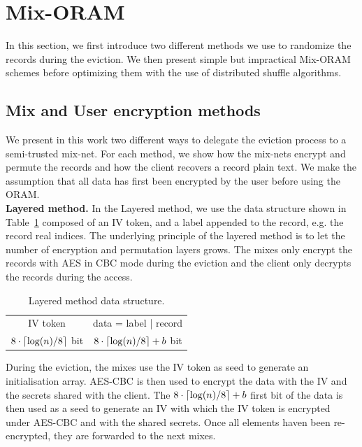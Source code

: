 \documentclass[USenglish,oneside,twocolumn]{article}
\DeclarePairedDelimiter{\ceil}{\lceil}{\rceil}
\begin{document}
\section{Mix-ORAM}\label{Mix-ORAM}
In this section, we first introduce two different methods we use to randomize the records during the eviction. We then present simple but impractical Mix-ORAM schemes before optimizing them with the use of distributed shuffle algorithms. 
%
\subsection{Mix and User encryption methods}\label{Enc}
We present in this work two different ways to delegate the eviction process to a semi-trusted mix-net. For each method, we show how the mix-nets encrypt and permute the records and how the client recovers a record plain text.
We make the assumption that all data has first been encrypted by the user before using the ORAM. \\

\textbf{Layered method.} In the Layered method, we use the data structure shown in Table~\ref{ldata} composed of an IV token, and a label appended to the record, e.g. the record real indices. The underlying principle of the layered method is to let the number of encryption and permutation layers grows. The mixes only encrypt the records with AES in CBC mode during the eviction and the client only decrypts the records during the access. 

\begin{table}[H]
\begin{minipage}[t][][b]{.475\textwidth}
\vspace{0pt}
\centering
\begin{tabular}{|c|c|}
IV token  &  data = label | record  \\
$8\cdot\ceil{\log(n)/8}$ bit  &  $8\cdot\ceil{\log(n)/8}+b$ bit   \\
\end{tabular}
\centering
\caption{Layered method data structure.}
\label{ldata}
\end{minipage}
\end{table}

During the eviction, the mixes use the IV token as seed to generate an initialisation array. AES-CBC is then used to encrypt the data with the IV and the secrets shared with the client. The $8\cdot\ceil{\log(n)/8}+b$ first bit of the data is then used as a seed to generate an IV with which the IV token is encrypted under AES-CBC and with the shared secrets. Once all elements haven been re-encrypted, they are forwarded to the next mixes.
\end{document}
